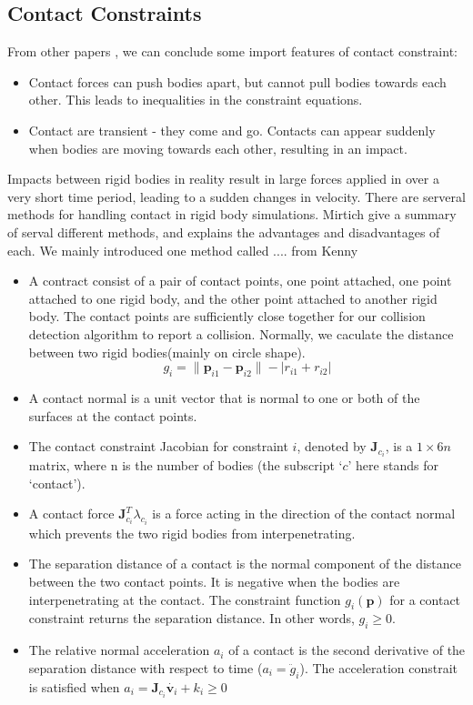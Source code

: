     \subsection{Contact Constraints}
        From other papers \cite{bender2014interactive}, we can conclude some import features of contact constraint:
        \begin{itemize}
            \item Contact forces can push bodies apart, but cannot pull bodies towards each other. This leads to inequalities in the constraint equations.
            \item Contact are transient - they come and go. Contacts can appear suddenly when bodies are moving towards each other, resulting in an impact.
        \end{itemize}
        Impacts between rigid bodies in reality result in large forces applied in over a very short time period, leading to a sudden changes in velocity. There are serveral methods for handling contact in rigid body simulations. Mirtich\cite{mirtich1998rigid} give a summary of serval different methods, and explains the advantages and disadvantages of each. We mainly introduced one  method called .... from Kenny\cite{erleben2017rigid}
        \begin{itemize}
            \item A contract consist of a pair of contact points, one point attached, one point attached to one rigid body, and the other point attached to another rigid body. The contact points are sufficiently close together for our collision detection algorithm to report a collision. Normally, we caculate the distance between two rigid bodies(mainly on circle shape).
            \begin{equation}
                g_i = \|\pmb{p}_{i1} - \pmb{p}_{i2}\| - |r_{i1} + r_{i2}|
            \end{equation}
            \item A contact normal is a unit vector that is normal to one or both of the surfaces at the contact points.
            \item The contact constraint Jacobian for constraint $i$, denoted by $\pmb{J}_{c_i}$, is a $1\times 6n$ matrix, where n is the number of bodies (the subscript `$c$' here stands for `contact').
            \item A contact force $\pmb{J}_{c_i}^{T}\lambda _{c_i}$ is a force acting in the direction of the contact normal which prevents the two rigid bodies from interpenetrating.
            \item The separation distance of a contact is the normal component of the distance between the two contact points. It is negative when the bodies are interpenetrating at the contact. The constraint function $g_{i}(\pmb{p})$ for a contact constraint returns the separation distance. In other words, $g_i \ge 0$.
            \item The relative normal acceleration $a_i$ of a contact is the second derivative of the separation distance with respect to time ($a_i = \ddot{g}_i$). The acceleration constrait is satisfied when $a_i = \pmb{J}_{c_i} \dot{\mathbf{v}_{i}}+ k_i \ge 0$
        \end{itemize}
